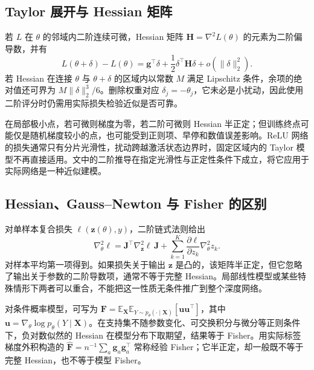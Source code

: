 \documentclass[UTF8,12pt,a4paper,fontset=fandol]{ctexart}
\begin{document}
\subsection{Taylor 展开与 Hessian 矩阵}
若 $L$ 在 $\theta$ 的邻域内二阶连续可微，Hessian 矩阵 $\mathbf H=\nabla^2L(\theta)$ 的元素为二阶偏导数，并有
\begin{equation}
 L(\theta+\delta)-L(\theta)
 =\mathbf g^\top\delta+\frac12\delta^\top\mathbf H\delta
 +o(\|\delta\|_2^2).
 \label{eq:prune-taylor}
\end{equation}
若 Hessian 在连接 $\theta$ 与 $\theta+\delta$ 的区域内以常数 $M$ 满足 Lipschitz 条件，余项的绝对值还可界为 $M\|\delta\|_2^3/6$。删除权重对应 $\delta_j=-\theta_j$，它未必是小扰动，因此使用二阶评分时仍需用实际损失检验近似是否可靠。

在局部极小点，若可微则梯度为零，若二阶可微则 Hessian 半正定；但训练终点可能仅是随机梯度较小的点，也可能受到正则项、早停和数值误差影响。ReLU 网络的损失通常只有分片光滑性，扰动跨越激活状态边界时，固定区域内的 Taylor 模型不再直接适用。文中的二阶推导在指定光滑性与正定性条件下成立，将它应用于实际网络是一种近似建模。

\subsection{Hessian、Gauss--Newton 与 Fisher 的区别}
对单样本复合损失 $\ell(\mathbf z(\theta),y)$，二阶链式法则给出
\begin{equation}
 \nabla_\theta^2\ell
 =\mathbf J^\top\nabla_{\mathbf z}^2\ell\,\mathbf J
 +\sum_{k=1}^K\frac{\partial\ell}{\partial z_k}\nabla_\theta^2z_k.
 \label{eq:prune-hessian-decomposition}
\end{equation}
对样本平均第一项得到。如果损失关于输出 $\mathbf z$ 是凸的，该矩阵半正定，但它忽略了输出关于参数的二阶导数项，通常不等于完整 Hessian。局部线性模型或某些特殊情形下两者可以重合，不能把这一性质无条件推广到整个深度网络。

对条件概率模型，可写为 $\mathbf F=\mathbb E_{\mathbf X}\mathbb E_{Y\sim p_\theta(\cdot\mid\mathbf X)}[\mathbf u\mathbf u^\top]$，其中 $\mathbf u=\nabla_\theta\log p_\theta(Y\mid\mathbf X)$。在支持集不随参数变化、可交换积分与微分等正则条件下，负对数似然的 Hessian 在模型分布下取期望，结果等于 Fisher。用实际标签梯度外积构造的 $\widehat{\mathbf F}=n^{-1}\sum_a\mathbf g_a\mathbf g_a^\top$ 常称经验 Fisher；它半正定，却一般既不等于完整 Hessian，也不等于模型 Fisher。
\end{document}
